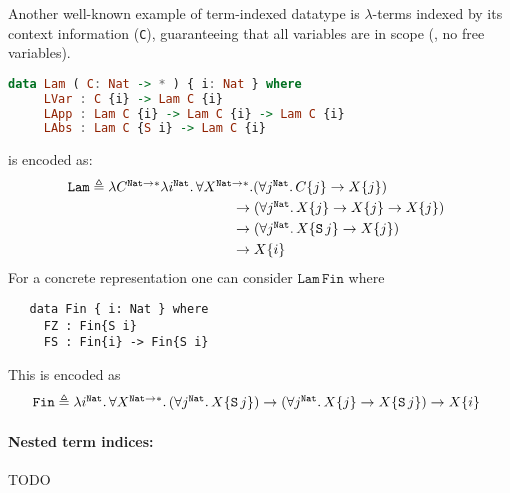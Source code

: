 \begin{example} Another well-known example of term-indexed datatype
        is \mbox{$\lambda$-terms} indexed by its context information
        (\texttt{C}), guaranteeing that all variables are in scope
        (\ie, no free variables).
\begin{lstlisting}[basicstyle={\ttfamily},language=Haskell]
   data Lam ( C: Nat -> * ) { i: Nat } where
     LVar : C {i} -> Lam C {i}
     LApp : Lam C {i} -> Lam C {i} -> Lam C {i}
     LAbs : Lam C {S i} -> Lam C {i}
\end{lstlisting}
is encoded as:
\[
\mathtt{Lam} \triangleq
\!\!\!
\begin{array}[t]{l}
\lambda C^{\mathtt{Nat}\to*}
\lambda i^\mathtt{Nat}.\,\forall X^{\mathtt{Nat}\to*}.
  (\forall j^\mathtt{Nat}.\,C\{j\} \to X\{j\})
\\[1mm]
\qquad\qquad\qquad\qquad\quad\,
 \to(\forall j^\mathtt{Nat}.\,X\{j\} \to X\{j\} \to X\{j\})
\\[1mm]
\qquad\qquad\qquad\qquad\quad\,
\to(\forall j^\mathtt{Nat}.\,X\{\mathtt S\, j\} \to X\{j\})
\\[1mm]
\qquad\qquad\qquad\qquad\quad\,
  \to X\{i\}
\end{array}
\]
For a concrete representation one can consider
$\mathtt{Lam}\,\mathtt{Fin}$ where
\begin{verbatim}
   data Fin { i: Nat } where
     FZ : Fin{S i}
     FS : Fin{i} -> Fin{S i}
\end{verbatim}
This is encoded as
\[
\mathtt{Fin}\triangleq
\!\!\!
\begin{array}[t]{l}
\lambda i^{\mathtt{Nat}}.\,\forall X^{\mathtt{Nat}\to*}.\,
(\forall j^\mathtt{Nat}.\, X\{\mathtt S\, j\})
        \to (\forall j^\mathtt{Nat}.\, X\{j\}\to X\{\mathtt S\,j\})
        \to X\{i\}
\end{array}
\]
\end{example}

\paragraph{Nested term indices:}
TODO



